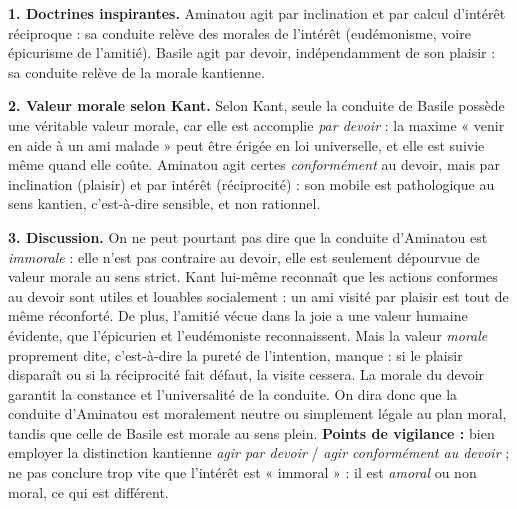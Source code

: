 \documentclass[11pt]{article}
\begin{document}
\begin{corrige}
\textbf{1. Doctrines inspirantes.} Aminatou agit par inclination et par calcul d'intérêt réciproque : sa conduite relève des morales de l'intérêt (eudémonisme, voire épicurisme de l'amitié). Basile agit par devoir, indépendamment de son plaisir : sa conduite relève de la morale kantienne.

\textbf{2. Valeur morale selon Kant.} Selon Kant, seule la conduite de Basile possède une véritable valeur morale, car elle est accomplie \emph{par devoir} : la maxime « venir en aide à un ami malade » peut être érigée en loi universelle, et elle est suivie même quand elle coûte. Aminatou agit certes \emph{conformément} au devoir, mais par inclination (plaisir) et par intérêt (réciprocité) : son mobile est pathologique au sens kantien, c'est-à-dire sensible, et non rationnel.

\textbf{3. Discussion.} On ne peut pourtant pas dire que la conduite d'Aminatou est \emph{immorale} : elle n'est pas contraire au devoir, elle est seulement dépourvue de valeur morale au sens strict. Kant lui-même reconnaît que les actions conformes au devoir sont utiles et louables socialement : un ami visité par plaisir est tout de même réconforté. De plus, l'amitié vécue dans la joie a une valeur humaine évidente, que l'épicurien et l'eudémoniste reconnaissent. Mais la valeur \emph{morale} proprement dite, c'est-à-dire la pureté de l'intention, manque : si le plaisir disparaît ou si la réciprocité fait défaut, la visite cessera. La morale du devoir garantit la constance et l'universalité de la conduite. On dira donc que la conduite d'Aminatou est moralement neutre ou simplement légale au plan moral, tandis que celle de Basile est morale au sens plein.
\textbf{Points de vigilance :} bien employer la distinction kantienne \emph{agir par devoir} / \emph{agir conformément au devoir} ; ne pas conclure trop vite que l'intérêt est « immoral » : il est \emph{amoral} ou non moral, ce qui est différent.
\end{corrige}
\end{document}
